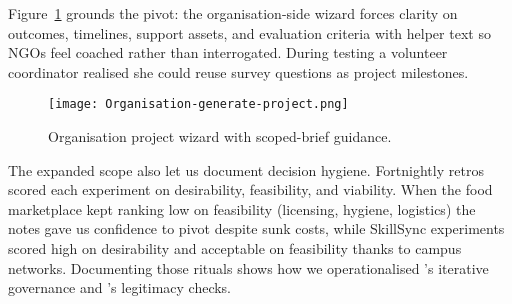 Figure~\ref{fig:project-creation} grounds the pivot: the organisation-side wizard forces clarity on outcomes, timelines, support assets, and evaluation criteria with helper text so NGOs feel coached rather than interrogated. During testing a volunteer coordinator realised she could reuse survey questions as project milestones.

\begin{figure}[H]
  \centering
  \texttt{[image: Organisation-generate-project.png]}
  \caption{Organisation project wizard with scoped-brief guidance.}
  \label{fig:project-creation}
\end{figure}

The expanded scope also let us document decision hygiene. Fortnightly retros scored each experiment on desirability, feasibility, and viability. When the food marketplace kept ranking low on feasibility (licensing, hygiene, logistics) the notes gave us confidence to pivot despite sunk costs, while SkillSync experiments scored high on desirability and acceptable on feasibility thanks to campus networks. Documenting those rituals shows how we operationalised \citet{Choudary2016}'s iterative governance and \citet{Srnicek2017}'s legitimacy checks.
